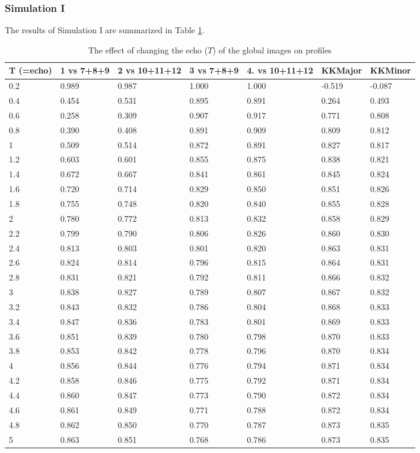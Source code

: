 \subsubsection*{Simulation I}
The results of Simulation I are summarized in Table
\ref{table_three}.
\begin{table}[!h]
\footnotesize
\begin{tabular}{lllllll}
T (=echo) & 1 vs 7+8+9 & 2 vs 10+11+12& 3 vs 7+8+9 & 4. vs
10+11+12 & KKMajor & KKMinor\\ \hline 0.2 & 0.989
&0.987&1.000&1.000&-0.519&-0.087 \\ 0.4 & 0.454& 0.531& 0.895&
0.891& 0.264& 0.493 \\ 0.6 & 0.258& 0.309& 0.907& 0.917& 0.771&
0.808 \\ 0.8& 0.390& 0.408& 0.891& 0.909& 0.809& 0.812 \\ 1
&0.509& 0.514& 0.872& 0.891& 0.827& 0.817 \\
1.2&0.603&0.601&0.855& 0.875& 0.838& 0.821 \\ 1.4& 0.672& 0.667&
0.841& 0.861& 0.845& 0.824 \\ 1.6&0.720& 0.714& 0.829& 0.850&
0.851& 0.826 \\ 1.8&0.755& 0.748& 0.820& 0.840& 0.855& 0.828 \\
2&0.780& 0.772& 0.813& 0.832& 0.858& 0.829 \\ 2.2&0.799& 0.790&
0.806& 0.826& 0.860& 0.830 \\ 2.4&0.813& 0.803& 0.801& 0.820&
0.863& 0.831 \\ 2.6 &0.824& 0.814& 0.796& 0.815& 0.864& 0.831 \\
2.8&0.831& 0.821& 0.792& 0.811& 0.866& 0.832 \\ 3&0.838& 0.827&
0.789& 0.807& 0.867& 0.832 \\ 3.2&0.843& 0.832& 0.786& 0.804&
0.868& 0.833 \\ 3.4&0.847& 0.836& 0.783& 0.801& 0.869& 0.833 \\
3.6&0.851& 0.839& 0.780& 0.798& 0.870& 0.833 \\ 3.8&0.853& 0.842&
0.778& 0.796& 0.870& 0.834 \\ 4&0.856& 0.844& 0.776& 0.794& 0.871&
0.834 \\ 4.2&0.858& 0.846& 0.775 &0.792& 0.871& 0.834 \\
4.4&0.860& 0.847& 0.773& 0.790& 0.872& 0.834 \\ 4.6&0.861& 0.849&
0.771& 0.788& 0.872& 0.834 \\ 4.8&0.862& 0.850& 0.770& 0.787&
0.873& 0.835 \\ 5&0.863&0.851&0.768&0.786&0.873&0.835 \\
\end{tabular}
\caption{The effect of changing the echo ($T$) of the global
images on profiles} \label{table_three}
\end{table}

